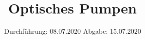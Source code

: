 

\subject{Nr. 21}
\title{Optisches Pumpen}
\date{%
  Durchführung: 08.07.2020
  \hspace{3em}
  Abgabe: 15.07.2020
}



\maketitle
\thispagestyle{empty}
\tableofcontents
\newpage






\printbibliography{}


